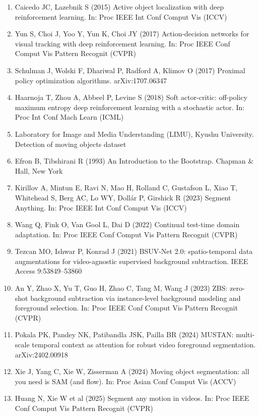 \documentclass[sn-basic]{sn-jnl}
\begin{document}
\begin{enumerate}
\item[{[25]}] Caicedo JC, Lazebnik S (2015) Active object localization with deep reinforcement learning. In: Proc IEEE Int Conf Comput Vis (ICCV)
\item[{[26]}] Yun S, Choi J, Yoo Y, Yun K, Choi JY (2017) Action-decision networks for visual tracking with deep reinforcement learning. In: Proc IEEE Conf Comput Vis Pattern Recognit (CVPR)
\item[{[27]}] Schulman J, Wolski F, Dhariwal P, Radford A, Klimov O (2017) Proximal policy optimization algorithms. arXiv:1707.06347
\item[{[28]}] Haarnoja T, Zhou A, Abbeel P, Levine S (2018) Soft actor-critic: off-policy maximum entropy deep reinforcement learning with a stochastic actor. In: Proc Int Conf Mach Learn (ICML)
\item[{[29]}] Laboratory for Image and Media Understanding (LIMU), Kyushu University. Detection of moving objects dataset
\item[{[30]}] Efron B, Tibshirani R (1993) An Introduction to the Bootstrap. Chapman \& Hall, New York
\item[{[31]}] Kirillov A, Mintun E, Ravi N, Mao H, Rolland C, Gustafson L, Xiao T, Whitehead S, Berg AC, Lo WY, Doll\'ar P, Girshick R (2023) Segment Anything. In: Proc IEEE Int Conf Comput Vis (ICCV)
\item[{[32]}] Wang Q, Fink O, Van Gool L, Dai D (2022) Continual test-time domain adaptation. In: Proc IEEE Conf Comput Vis Pattern Recognit (CVPR)
\item[{[33]}] Tezcan MO, Ishwar P, Konrad J (2021) BSUV-Net 2.0: spatio-temporal data augmentations for video-agnostic supervised background subtraction. IEEE Access 9:53849--53860
\item[{[34]}] An Y, Zhao X, Yu T, Guo H, Zhao C, Tang M, Wang J (2023) ZBS: zero-shot background subtraction via instance-level background modeling and foreground selection. In: Proc IEEE Conf Comput Vis Pattern Recognit (CVPR)
\item[{[35]}] Pokala PK, Pandey NK, Patibandla JSK, Pailla BR (2024) MUSTAN: multi-scale temporal context as attention for robust video foreground segmentation. arXiv:2402.00918
\item[{[36]}] Xie J, Yang C, Xie W, Zisserman A (2024) Moving object segmentation: all you need is SAM (and flow). In: Proc Asian Conf Comput Vis (ACCV)
\item[{[37]}] Huang N, Xie W et al (2025) Segment any motion in videos. In: Proc IEEE Conf Comput Vis Pattern Recognit (CVPR)
\end{enumerate}
\end{document}
